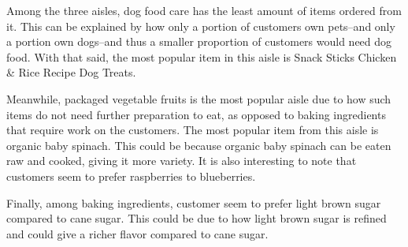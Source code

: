 \documentclass[
]{article}
\begin{document}
Among the three aisles, dog food care has the least amount of items
ordered from it. This can be explained by how only a portion of
customers own pets--and only a portion own dogs--and thus a smaller
proportion of customers would need dog food. With that said, the most
popular item in this aisle is Snack Sticks Chicken \& Rice Recipe Dog
Treats.

Meanwhile, packaged vegetable fruits is the most popular aisle due to
how such items do not need further preparation to eat, as opposed to
baking ingredients that require work on the customers. The most popular
item from this aisle is organic baby spinach. This could be because
organic baby spinach can be eaten raw and cooked, giving it more
variety. It is also interesting to note that customers seem to prefer
raspberries to blueberries.

Finally, among baking ingredients, customer seem to prefer light brown
sugar compared to cane sugar. This could be due to how light brown sugar
is refined and could give a richer flavor compared to cane sugar.
\end{document}
